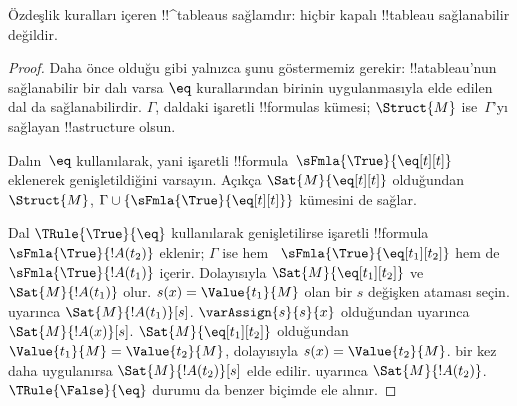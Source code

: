 



\begin{prop}
Özdeşlik kuralları içeren !!^{tableau}s sağlamdır: hiçbir kapalı !!{tableau}
sağlanabilir değildir.
\end{prop}

\begin{proof}
Daha önce olduğu gibi yalnızca şunu göstermemiz gerekir: !!a{tableau}'nun
sağlanabilir bir dalı varsa $\eq$ kurallarından birinin uygulanmasıyla elde
edilen dal da sağlanabilirdir. $\Gamma$, daldaki işaretli !!{formula}s
kümesi; $\Struct{M}$ ise~$\Gamma$'yı sağlayan !!a{structure} olsun.

Dalın~$\eq$ kullanılarak, yani işaretli
!!{formula}~$\sFmla{\True}{\eq[t][t]}$ eklenerek genişletildiğini varsayın.
Açıkça $\Sat{M}{\eq[t][t]}$ olduğundan $\Struct{M}$,
$\Gamma \cup \{\sFmla{\True}{\eq[t][t]}\}$ kümesini de sağlar.

Dal $\TRule{\True}{\eq}$ kullanılarak genişletilirse işaretli
!!{formula}~$\sFmla{\True}{!A(t_2)}$ eklenir; $\Gamma$ ise hem
~$\sFmla{\True}{\eq[t_1][t_2]}$ hem de $\sFmla{\True}{!A(t_1)}$ içerir.
Dolayısıyla $\Sat{M}{\eq[t_1][t_2]}$ ve $\Sat{M}{!A(t_1)}$ olur.
$s(x) = \Value{t_1}{M}$ olan bir $s$ değişken ataması seçin.
 uyarınca
$\Sat{M}{!A(t_1)}[s]$. $\varAssign{s}{s}{x}$ olduğundan
 uyarınca $\Sat{M}{!A(x)}[s]$.
$\Sat{M}{\eq[t_1][t_2]}$ olduğundan
$\Value{t_1}{M} = \Value{t_2}{M}$, dolayısıyla
$s(x) = \Value{t_2}{M}$.  bir kez daha
uygulanırsa $\Sat{M}{!A(t_2)}[s]$ elde edilir.
 uyarınca
$\Sat{M}{!A(t_2)}$. $\TRule{\False}{\eq}$ durumu da benzer biçimde ele
alınır.
\end{proof}

